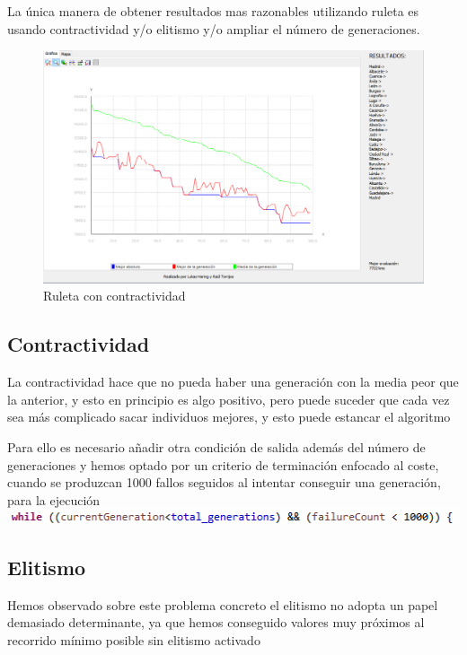 \documentclass{article}
\begin{document}
La única manera de obtener resultados mas razonables utilizando ruleta es usando contractividad y/o elitismo y/o ampliar el número de generaciones.


\begin{figure}[h]
	\centering
	\includegraphics[scale=0.4]{./images/rule2.png}
	\caption{Ruleta con contractividad}
\end{figure}

\newpage
\subsection{Contractividad}
La contractividad hace que no pueda haber una generación con la media peor que la anterior, y esto en principio es algo positivo, pero puede suceder que cada vez sea más complicado sacar individuos mejores, y esto puede estancar el algoritmo\par Para ello es necesario añadir otra condición de salida además del número de generaciones y hemos optado por un criterio de terminación enfocado al coste, cuando se produzcan 1000 fallos seguidos al intentar conseguir una generación, para la ejecución
\\

\includegraphics[scale=0.83]{./images/cont.png}

\subsection{Elitismo}
Hemos observado sobre este problema concreto el elitismo no adopta un papel demasiado determinante, ya que hemos conseguido valores muy próximos al recorrido mínimo posible sin elitismo activado
\newpage
\end{document}
